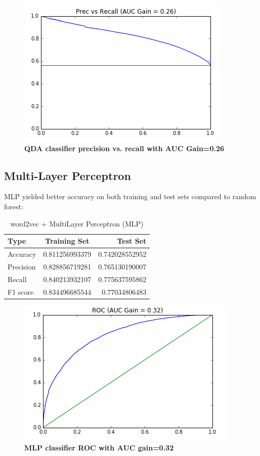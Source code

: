 \documentclass{sig-alternate-05-2015}
\begin{document}
	
	\begin{figure}[H]
		\centering\includegraphics[scale=0.55]{prrc_qda} 
		\caption{\textbf{ QDA classifier precision vs. recall with AUC Gain=0.26 }}
	\end{figure}


	\subsection{Multi-Layer Perceptron}
	MLP yielded better accuracy on both training and test sets compared to random forest:
	\begin{table}[h!]
		\begin{center}
			\caption{word2vec + MultiLayer Perceptron (MLP)}
			\label{tab:table1}
			\begin{tabular}{l|c|r} %
				\textbf{Type} & \textbf{Training Set} & \textbf{Test Set}\\
				\hline
				Accuracy & 0.811256993379 & 0.742028552952 \\
				Precision & 0.828856719281 & 0.765130190007 \\
				Recall & 0.840213932107  & 0.775637595862\\
				F1 score & 0.834496685544 & 0.77034806483
			\end{tabular}
		\end{center}
	\end{table}
	
	
	\begin{figure}[H]
		\centering\includegraphics[scale=0.55]{ROC_nn} 
		\caption{\textbf{ MLP classifier ROC with AUC gain=0.32 }}
	\end{figure}
	
\end{document}
